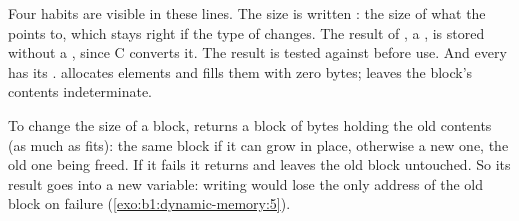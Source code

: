\label{lst:b1:dynamic-memory:basic}


Four habits are visible in these lines. The size is written : the size of what the 
points to, which stays right if the type of  changes. The result of , a , is
stored without a , since C converts it. The result is tested against  before use. And every
 has its .  allocates  elements and fills them with zero bytes;
 leaves the block's contents indeterminate.


\label{out:b1:dynamic-memory:null}

To change the size of a block,  returns a block of  bytes holding the old contents
(as much as fits): the same block if it can grow in place, otherwise a new one, the old one being freed. If it fails it
returns  and leaves the old block untouched. So its result goes into a new variable: writing
 would lose the only address of the old block on failure
(\cref{exo:b1:dynamic-memory:5}).

\label{lst:b1:dynamic-memory:realloc}


